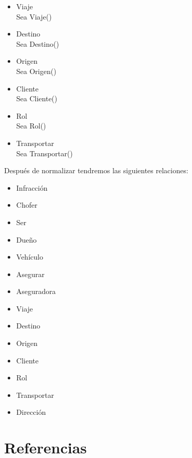 \documentclass{article}
\begin{document}
\begin{itemize}
\item Viaje\\
Sea Viaje()


\item Destino\\
Sea Destino()


\item Origen\\
Sea Origen()


\item Cliente\\
Sea Cliente()


\item Rol\\
Sea Rol()


\item Transportar\\
Sea Transportar()


\end{itemize}
Después de normalizar tendremos las siguientes relaciones:
\begin{itemize}
\item Infracción\\
\item Chofer\\
\item Ser\\
\item Dueño\\
\item Vehículo\\
\item Asegurar\\
\item Aseguradora\\
\item Viaje\\
\item Destino\\
\item Origen\\
\item Cliente\\
\item Rol\\
\item Transportar\\
\item Dirección\\

\end{itemize}




\section{Referencias}
\end{document}
